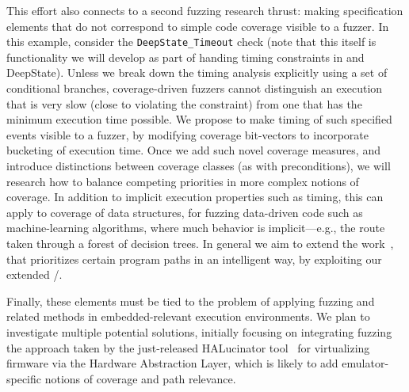   This effort also connects to a second fuzzing research thrust: making specification elements that do not correspond to simple code coverage visible to a fuzzer.  In this example, consider the {\tt DeepState\_Timeout} check (note that this itself is functionality we will develop as part of handing timing constraints in \framac and DeepState).  Unless we break down the timing analysis explicitly using a set of conditional branches, coverage-driven fuzzers cannot distinguish an execution that is very slow (close to violating the constraint) from one that has the minimum execution time possible.  We propose to make timing of such specified events visible to a fuzzer, by modifying coverage bit-vectors to incorporate bucketing of execution time.  Once we add such novel coverage measures, and introduce distinctions between coverage classes (as with preconditions), we will research how to balance competing priorities in more complex notions of coverage.  In addition to implicit execution properties such as timing, this can apply to coverage of data structures, for fuzzing data-driven code such as machine-learning algorithms, where much behavior is implicit---e.g., the route taken through a forest of decision trees.  In general we aim to extend the work~\cite{aflfast,lemieux2018fairfuzz,vuzzer,zhao2019send,aschermann2019redqueen}, that prioritizes certain program paths in an intelligent way, by exploiting our extended \acsl/\eacsl.

Finally, these elements must be tied to the problem of applying fuzzing and related methods in embedded-relevant execution environments.  We plan to investigate multiple potential solutions, initially focusing on integrating fuzzing the approach taken by the just-released HALucinator tool~\cite{halucinator} for virtualizing firmware via the Hardware Abstraction Layer, which is likely to add emulator-specific notions of coverage and path relevance.

